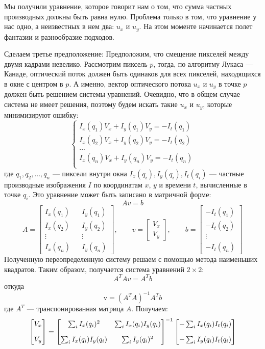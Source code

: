 Мы получили уравнение, которое говорит нам о том, что сумма частных производных должны быть равна нулю. Проблема только в том, что уравнение у нас одно, а неизвестных в нем два: $u_x$ и $u_y$. На этом моменте начинается полет фантазии и разнообразие подходов.

Сделаем третье предположение: Предположим, что смещение пикселей между двумя кадрами невелико. Рассмотрим пиксель $p$, тогда, по алгоритму Лукаса — Канаде, оптический поток должен быть одинаков для всех пикселей, находящихся в окне с центром в $p$. А именно, вектор оптического потока $u_x$ и $u_y$ в точке $p$ должен быть решением системы уравнений. Очевидно, что в общем случае система не имеет решения, поэтому будем искать такие $u_x$ и $u_y$, которые минимизируют ошибку:
$$
\begin{cases}
I_x(q_1) V_x + I_y (q_1) V_y = -I_t(q_1)\\
I_x(q_2) V_x + I_y (q_2) V_y = -I_t(q_2)\\
...\\
I_x(q_n) V_x + I_y (q_n) V_y = -I_t(q_n)\\
\end{cases}
$$
где $q_1,q_2,\dots,q_n$ — пиксели внутри окна
$I_x(q_i),I_y(q_i),I_t(q_i)$ — частные производные изображения $I$ по координатам $x$, $y$ и времени $t$, вычисленные в точке $q_i$.
Это уравнение может быть записано в матричной форме:
$$A v = b$$
$$A = \begin{bmatrix}
I_x(q_1) && I_y(q_1) \\
I_x(q_2) && I_y(q_2) \\
\vdots && \vdots \\
I_x(q_n) && I_y(q_n)
\end{bmatrix},
\quad\quad
v =
\begin{bmatrix}
V_x\\
V_y
\end{bmatrix},
\quad\quad
b =
\begin{bmatrix}
-I_t(q_1)\\
-I_t(q_2)\\
\vdots \\
-I_t(q_n)
\end{bmatrix} $$
Полученную переопределенную систему решаем с помощью метода наименьших квадратов. Таким образом, получается система уравнений $2 \times 2$:
$$A^T A v=A^T b$$
откуда
$$\mathrm{v}=(A^T A)^{-1}A^T b$$
где $A^T$ — транспонированная матрица $A$. Получаем:
\begin{equation}
\numberwithin{equation}{section}
\label{eq:lucas}
\begin{bmatrix} V_x\\[10pt] V_y \end{bmatrix} = \begin{bmatrix} \sum_i I_x(q_i)^2 & \sum_i I_x(q_i)I_y(q_i) \\[10pt] \sum_i I_x(q_i)I_y(q_i) & \sum_i I_y(q_i)^2 \end{bmatrix}^{-1} \begin{bmatrix} -\sum_i I_x(q_i)I_t(q_i) \\[10pt] -\sum_i I_y(q_i)I_t(q_i) \end{bmatrix}
\end{equation}

